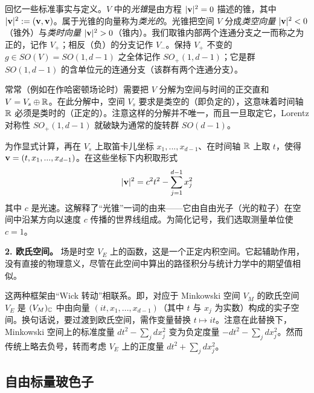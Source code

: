 回忆一些标准事实与定义。$V$ 中的\emph{光锥}是由方程 $|\bold v|^2=0$ 描述的锥，其中 $|\bold v|^2:=(\bold v,\bold v)$。属于光锥的向量称为\emph{类光的}。光锥把空间 $V$ 分成\emph{类空向量} $|\bold v|^2<0$（锥外）与\emph{类时向量} $|\bold v|^2>0$（锥内）。我们取锥内部两个连通分支之一而称之为正的，记作 $V_+$；相反（负）的分支记作 $V_-$。保持 $V_+$ 不变的 $g\in SO(V)=SO(1,d-1)$ 之全体记作 $SO_+(1,d-1)$；它是群 $SO(1,d-1)$ 的含单位元的连通分支（该群有两个连通分支）。

常常（例如在作哈密顿场论时）需要把 $V$ 分解为空间与时间的正交直和 $V=V_s\oplus \Bbb R$。在此分解中，空间 $V_s$ 要求是类空的（即负定的），这意味着时间轴 ${\Bbb R}$ 必须是类时的（正定的）。注意这样的分解并不唯一，而且一旦取定它，Lorentz 对称性 $SO_+(1,d-1)$ 就破缺为通常的旋转群 $SO(d-1)$。

为作显式计算，再在 $V_s$ 上取笛卡儿坐标 $x_1,...,x_{d-1}$、在时间轴 $\Bbb R$ 上取 $t$，使得 $\bold v=(t,x_1,...,x_{d-1})$。在这些坐标下内积取形式
$$
|\bold v|^2=c^2t^2-\sum_{j=1}^{d-1}x_j^2
$$
其中 $c$ 是光速。这解释了“光锥”一词的由来——它由自由光子（光的粒子）在空间中沿某方向以速度 $c$ 传播的世界线组成。为简化记号，我们选取测量单位使 $c=1$。

\textbf{2. 欧氏空间。} 场是时空 $V_E$ 上的函数，这是一个正定内积空间。它起辅助作用，没有直接的物理意义，尽管在此空间中算出的路径积分与统计力学中的期望值相似。

这两种框架由“Wick 转动”相联系。即，对应于 Minkowski 空间 $V_M$ 的欧氏空间 $V_E$ 是 $(V_M)_{\Bbb C}$ 中由向量 $(it,x_1,...,x_{d-1})$（其中 $t$ 与 $x_j$ 为实数）构成的实子空间。换句话说，要过渡到欧氏空间，需作变量替换 $t\mapsto it$。注意在此替换下，Minkowski 空间上的标准度量 $dt^2-\sum_j dx_j^2$ 变为负定度量 $-dt^2-\sum_j dx_j^2$。然而传统上略去负号，转而考虑 $V_E$ 上的正度量 $dt^2+\sum_j dx_j^2$。


\subsection{自由标量玻色子}

